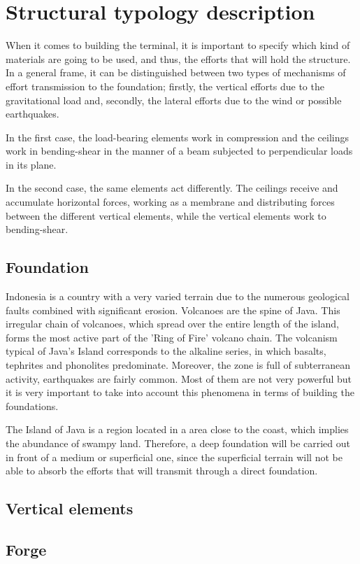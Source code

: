 \chapter{Structural typology description}
When it comes to building the terminal, it is important to specify which kind of materials are going to be used, and thus, the efforts that will hold the structure. In a general frame, it can be distinguished between two types of mechanisms of effort transmission to the foundation; firstly, the vertical efforts due to the gravitational load and, secondly, the lateral efforts due to the wind or possible earthquakes.

In the first case, the load-bearing elements work in compression and the ceilings work in bending-shear in the manner of a beam subjected to perpendicular loads in its plane.

In the second case, the same elements act differently. The ceilings receive and accumulate horizontal forces, working as a membrane and distributing forces between the different vertical elements, while the vertical elements work to bending-shear.

	\section{Foundation}
Indonesia is a country with a very varied terrain due to the numerous geological faults combined with significant erosion. Volcanoes are the spine of Java. This irregular chain of volcanoes, which spread over the entire length of the island, forms the most active part of the 'Ring of Fire' volcano chain. The volcanism typical of Java's Island corresponds to the alkaline series, in which basalts, tephrites and phonolites predominate. Moreover, the zone is full of subterranean activity, earthquakes are fairly common. Most of them are not very powerful but it is very important to take into account this phenomena in terms of building the foundations.

The Island of Java is a region located in a area close to the coast, which implies the abundance of swampy land. Therefore, a deep foundation will be carried out in front of a medium or superficial one, since the superficial terrain will not be able to absorb the efforts that will transmit through a direct foundation.


	\section{Vertical elements}
	
	\section{Forge}